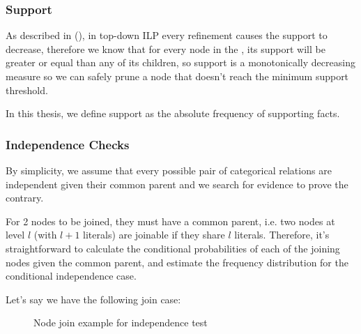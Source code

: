 \subsubsection{Support}

As described in (\cite{LavracDz94}), in top-down ILP every refinement causes the support to decrease, therefore we know
that for every node in the \graphname, its support will be greater or equal than any of its children, so support is a
monotonically decreasing measure so we can safely prune a node that doesn't reach the minimum support threshold.

In this thesis, we define support as the absolute frequency of supporting facts.


\subsubsection{Independence Checks}

By simplicity, we assume that every possible pair of categorical relations are independent given their common parent and
we search for evidence to prove the contrary.

For 2 nodes to be joined, they must have a common parent, i.e. two nodes at level $l$ (with $l+1$ literals) are joinable
if they share $l$ literals. Therefore, it's straightforward to calculate the conditional probabilities of each of the
joining nodes given the common parent, and estimate the frequency distribution for the conditional independence case.

Let's say we have the following join case:
 
\begin{figure}[!h]
  \caption{Node join example for independence test}
  \centering
  \label{fig:joinIndepExample}
\end{figure}

